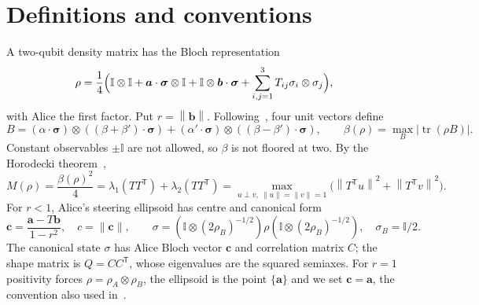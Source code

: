 \documentclass[11pt]{article}
\theoremstyle{remark}\newtheorem{remark}[theorem]{Remark}
\DeclareMathOperator{\tr}{tr}\DeclareMathOperator{\diag}{diag}
\newcommand{\id}{\mathbb I}\newcommand{\ket}[1]{|#1\rangle}
\newcommand{\norm}[1]{\left\lVert#1\right\rVert}
\newcommand{\cv}{\bm c}\newcommand{\av}{\bm a}\newcommand{\bv}{\bm b}
\begin{document}
\section{Definitions and conventions}\label{sec:defs}

A two-qubit density matrix has the Bloch representation
\begin{equation}\label{eq:bloch}
 \rho=\frac14\Bigl(\id\otimes\id+\av\cdot\bm\sigma\otimes\id
 +\id\otimes\bv\cdot\bm\sigma+\sum_{i,j=1}^{3}T_{ij}\sigma_i\otimes\sigma_j\Bigr),
\end{equation}
with Alice the first factor. Put $r=\norm{\bv}$. Following~\cite{milne}, four
unit vectors define
\[
 B=(\alpha\cdot\bm\sigma)\otimes((\beta+\beta')\cdot\bm\sigma)
 +(\alpha'\cdot\bm\sigma)\otimes((\beta-\beta')\cdot\bm\sigma),
 \qquad \beta(\rho)=\max_B|\tr(\rho B)|.
\]
Constant observables $\pm\id$ are not allowed, so $\beta$ is not floored at
two. By the Horodecki theorem~\cite{horodecki},
\begin{equation}\label{eq:horodecki}
 M(\rho)=\frac{\beta(\rho)^2}{4}
 =\lambda_1(TT^{\mathsf T})+\lambda_2(TT^{\mathsf T})
 =\max_{u\perp v,\ \norm u=\norm v=1}\bigl(\norm{T^{\mathsf T}u}^2+\norm{T^{\mathsf T}v}^2\bigr).
\end{equation}
For $r<1$, Alice's steering ellipsoid has centre and canonical form
\begin{equation}\label{eq:centre}
 \cv=\frac{\av-T\bv}{1-r^2},\quad c=\norm{\cv},\qquad
 \sigma=(\id\otimes(2\rho_B)^{-1/2})\rho(\id\otimes(2\rho_B)^{-1/2}),
 \quad\sigma_B=\id/2.
\end{equation}
The canonical state $\sigma$ has Alice Bloch vector $\cv$ and correlation
matrix $C$; the shape matrix is $Q=CC^{\mathsf T}$, whose eigenvalues are the
squared semiaxes. For $r=1$ positivity forces $\rho=\rho_A\otimes\rho_B$, the
ellipsoid is the point $\{\av\}$ and we set $\cv=\av$, the convention also
used in~\cite{dossier}.
\end{document}
